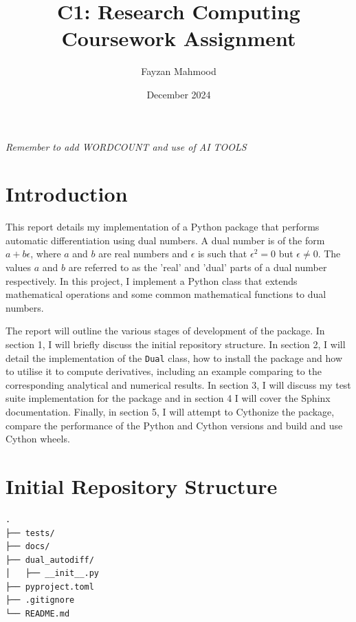 \documentclass{article}
\title{C1: Research Computing Coursework Assignment}
\author{Fayzan Mahmood}
\date{December 2024}
\begin{document}
\maketitle
\textit{Remember to add WORDCOUNT and use of AI TOOLS}

\section*{Introduction}
This report details my implementation of a Python package that performs automatic differentiation using dual numbers. A dual number is of the form $a+b\epsilon$, where $a$ and $b$ are real numbers and $\epsilon$ is such that $\epsilon^2=0$ but $\epsilon \neq 0$. The values $a$ and $b$ are referred to as the 'real' and 'dual' parts of a dual number respectively. In this project, I implement a Python class that extends mathematical operations and some common mathematical functions to dual numbers. 

The report will outline the various stages of development of the package. In section 1, I will briefly discuss the initial repository structure. In section 2, I will detail the implementation of the \texttt{Dual} class, how to install the package and how to utilise it to compute derivatives, including an example comparing to the corresponding analytical and numerical results. In section 3, I will discuss my test suite implementation for the package and in section 4 I will cover the Sphinx documentation. Finally, in section 5, I will attempt to Cythonize the package, compare the performance of the Python and Cython versions and build and use Cython wheels.

\section{Initial Repository Structure}

\begin{verbatim}
.
├── tests/
├── docs/
├── dual_autodiff/
│   ├── __init__.py
├── pyproject.toml
├── .gitignore 
└── README.md
        
\end{verbatim}  
\end{document}
